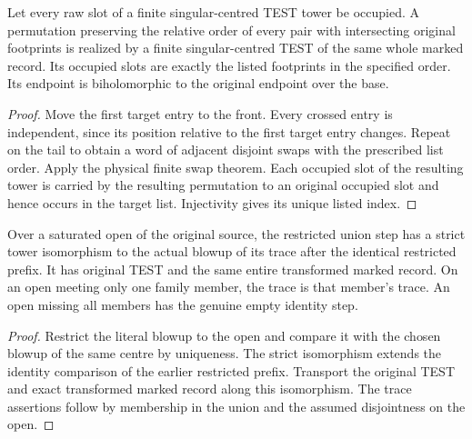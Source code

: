 \begin{theorem}
\label{hir:g8-finite-spatial-order}
\leanok
Let every raw slot of a finite singular-centred TEST tower be
occupied. A permutation preserving the relative order of every
pair with intersecting original footprints is realized by a finite
singular-centred TEST of the same whole marked record. Its occupied
slots are exactly the listed footprints in the specified order.
Its endpoint is biholomorphic to the original endpoint over the base.
\end{theorem}
\begin{proof}
Move the first target entry to the front. Every crossed entry is
independent, since its position relative to the first target entry
changes. Repeat on the tail to obtain a word of adjacent disjoint
swaps with the prescribed list order. Apply the physical finite swap
theorem. Each occupied slot of the resulting tower is carried by
the resulting permutation to an original occupied slot and hence
occurs in the target list. Injectivity gives its unique listed index.
\end{proof}

\begin{proposition}
\label{hir:g8-parallel-step-readback}
\leanok
Over a saturated open of the original source, the restricted union
step has a strict tower isomorphism to the actual blowup of its trace
after the identical restricted prefix. It has original TEST and the
same entire transformed marked record. On an open meeting only one
family member, the trace is that member's trace. An open missing all
members has the genuine empty identity step.
\end{proposition}
\begin{proof}
Restrict the literal blowup to the open and compare it with the
chosen blowup of the same centre by uniqueness. The strict isomorphism
extends the identity comparison of the earlier restricted prefix.
Transport the original TEST and exact transformed marked record along
this isomorphism. The trace assertions follow by membership in the
union and the assumed disjointness on the open.
\end{proof}

